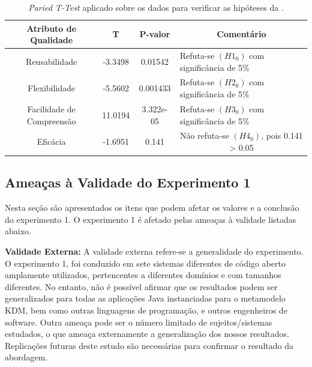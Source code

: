 \begin{table}[]
\centering
\caption{\textit{Paried T-Test} aplicado sobre os dados para verificar as hipóteses da .}
\label{tab:experimento_1_10_15}
\begin{tabular}{|m{1cm}|l|l|m{7.1cm}|}
\hline
\multicolumn{1}{|c|}{Atributo de Qualidade} & \multicolumn{1}{c|}{T} & \multicolumn{1}{c|}{P-valor} & \multicolumn{1}{c|}{Comentário} \\ \hline
\multicolumn{1}{|c|}{Reusabilidade} & \multicolumn{1}{c|}{-3.3498} & \multicolumn{1}{c|}{0.01542} & Refuta-se \textbf{$(H1_{0})$} com significância de 5\%\\ \hline
\multicolumn{1}{|c|}{Flexibilidade} &\multicolumn{1}{c|}{-5.5602}& \multicolumn{1}{c|}{0.001433} &Refuta-se \textbf{$(H2_{0})$} com significância de 5\%\\ \hline
\multicolumn{1}{|c|}{Facilidade de Compreensão} & \multicolumn{1}{c|}{11.0194} &    \multicolumn{1}{c|}{3.322e-05}&Refuta-se \textbf{$(H3_{0})$} com significância de 5\%\\ \hline
\multicolumn{1}{|c|}{Eficácia}&\multicolumn{1}{c|}{-1.6951}&\multicolumn{1}{c|}{0.141}&\multicolumn{1}{c|}{Não refuta-se \textbf{$(H4_{0})$}, pois 0.141 > 0.05}\\ \hline
\end{tabular}
\end{table}

\subsection{Ameaças à Validade do Experimento 1}

Nesta seção são apresentados os itens que podem afetar os valores e a conclusão do experimento 1. O experimento 1 é afetado pelas ameaças à validade listadas abaixo.

\textbf{Validade Externa:} A validade externa refere-se a generalidade do experimento. O experimento 1, foi conduzido em sete sistemas diferentes de código aberto amplamente utilizados, pertencentes a diferentes domínios e com tamanhos diferentes. No entanto, não é possível afirmar que os resultados podem ser generalizados para todas as aplicações Java instanciadas para o metamodelo KDM, bem como outras linguagens de programação, e outros engenheiros de software. Outra ameaça pode ser o número limitado de sujeitos/sistemas estudados, o que ameaça externamente a generalização dos nossos resultados. Replicações futuras deste estudo são necessárias para confirmar o resultado da abordagem.


